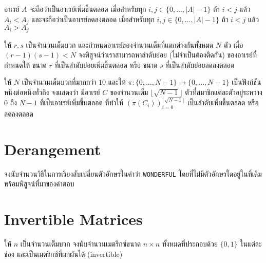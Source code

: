 \begin{definition}
อาเรย์ $A$ จะถือว่าเป็นอาเรย์เพิ่มขึ้นตลอด เมื่อสำหรับทุก $i, j \in \{0, \dots, |A|-1\}$ ถ้า $i < j$ แล้ว $A_i < A_j$ และจะถือว่าเป็นอาเรย์ลดลงตลอด เมื่อสำหรับทุก $i, j \in \{0, \dots, |A|-1\}$ ถ้า $i < j$ แล้ว $A_i > A_j$
\end{definition}

\begin{exercise}
ให้ $r, s$ เป็นจำนวนเต็มบวก และกำหนดอาเรย์ของจำนวนเต็มที่แตกต่างกันทั้งหมด $N$ ตัว เมื่อ $(r-1)(s-1) < N$ จงพิสูจน์ว่าเราสามารถหาลำดับย่อย (ไม่จำเป็นต้องติดกัน) ของอาเรย์ที่กำหนดให้ ขนาด $r$ ที่เป็นลำดับย่อยเพิ่มขึ้นตลอด หรือ ขนาด $s$ ที่เป็นลำดับย่อยลดลงตลอด
\end{exercise}

\begin{exercise}
ให้ $N$ เป็นจำนวนเต็มบวกที่มากกว่า $10$ และให้ $\pi \colon \{0, \dots, N-1\} \to \{0, \dots, N-1\}$ เป็นฟังก์ชันหนึ่งต่อหนึ่งทั่วถึง จงแสดงว่า มีอาเรย์ $C$ ของจำนวนเต็ม $\lfloor \sqrt{N-1} \rfloor$ ตัวที่สมาชิกแต่ละตัวอยู่ระหว่าง $0$ ถึง $N-1$ ที่เป็นอาเรย์เพิ่มขึ้นตลอด ที่ทำให้ $(\pi(C_i))_{i=0}^{\lfloor\sqrt{N-1}\rfloor}$ เป็นลำดับเพิ่มขึ้นตลอด หรือลดลงตลอด
\end{exercise}

\section{Derangement}

\begin{exercise}
จงนับจำนวนวิธีในการเรียงสับเปลี่ยนตัวอักษรในคำว่า \texttt{WONDERFUL} โดยที่ไม่มีตัวอักษรใดอยู่ในที่เดิม พร้อมพิสูจน์ที่มาของคำตอบ
\end{exercise}

\section{Invertible Matrices}

\begin{exercise}
ให้ $n$ เป็นจำนวนเต็มบวก จงนับจำนวนเมตริกซ์ขนาด $n \times n$ ทั้งหมดที่ประกอบด้วย $\{0, 1\}$ ในแต่ละช่อง และเป็นเมตริกซ์ที่ผกผันได้ (invertible)
\end{exercise}



